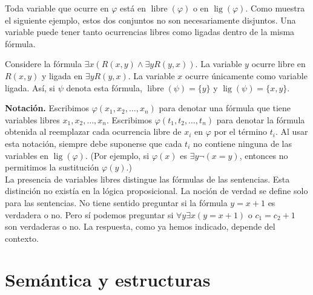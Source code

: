 \message{ !name(main.tex)}\documentclass[12pt,a4paper]{book}
\DeclareMathOperator{\libre}{libre}
\DeclareMathOperator{\lig}{lig}
\begin{document}
    Toda variable que ocurre en $\varphi$ está en $\libre(\varphi)$ o en $\lig(\varphi)$. Como muestra el siguiente ejemplo,
    estos dos conjuntos no son necesariamente disjuntos. Una variable puede tener tanto ocurrencias libres como ligadas
    dentro de la misma fórmula.

    \begin{ejemplo}
        Considere la fórmula $\exists x(R(x,y)\wedge\exists yR(y,x))$. La variable $y$ ocurre libre en $R(x,y)$ y ligada en
        $\exists yR(y,x)$. La variable $x$ ocurre únicamente como variable ligada. Así, si $\psi$ denota esta fórmula,
        $\libre(\psi)=\{y\}$ y $\lig(\psi)=\{x,y\}$.
    \end{ejemplo}

    \textbf{Notación.} Escribimos $\varphi(x_{1},x_{2},\dots,x_{n})$ para denotar una fórmula que tiene variables libres
    $x_{1},x_{2},\dots,x_{n}$. Escribimos $\varphi(t_{1},t_{2},\dots,t_{n})$ para denotar la fórmula obtenida al reemplazar
    cada ocurrencia libre de $x_{i}$ en $\varphi$ por el término $t_{i}$. Al usar esta notación, siempre debe suponerse que
    cada $t_{i}$ no contiene ninguna de las variables en $\lig(\varphi)$. (Por ejemplo, si $\varphi(x)$ es
    $\exists y\neg(x=y)$, entonces no permitimos la sustitución $\varphi(y)$.)\\
    La presencia de variables libres distingue las fórmulas de las sentencias. Esta distinción no existía en la lógica
    proposicional. La noción de verdad se define solo para las sentencias. No tiene sentido preguntar si la fórmula
    $y=x+1$ es verdadera o no. Pero sí podemos preguntar si $\forall y\exists x(y=x+1)$ o $c_{1}=c_{2}+1$ son verdaderas o
    no. La respuesta, como ya hemos indicado, depende del contexto.

    \section{Semántica y estructuras}
\end{document}
